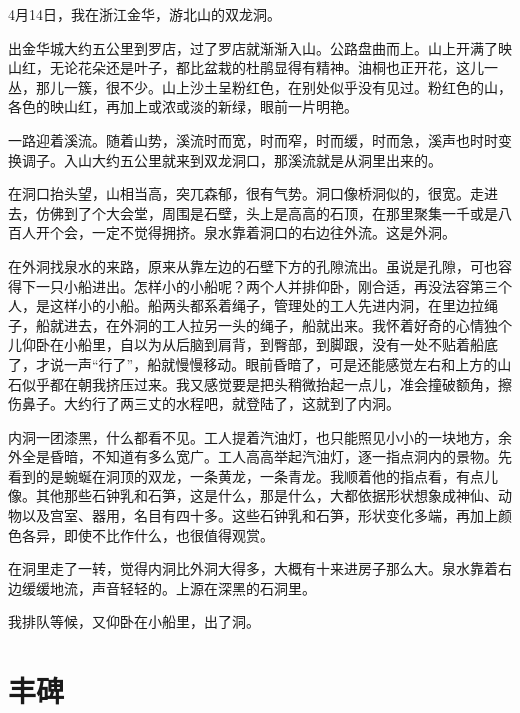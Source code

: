 \documentclass[12pt,UTF-8,openany]{ctexbook}
\begin{document}
\begin{large}
    
    4月14日，我在浙江金华，游北山的双龙洞。
    
    出金华城大约五公里到罗店，过了罗店就渐渐入山。公路盘曲而上。山上开满了映山红，无论花朵还是叶子，都比盆栽的杜鹃显得有精神。油桐也正开花，这儿一丛，那儿一簇，很不少。山上沙土呈粉红色，在别处似乎没有见过。粉红色的山，各色的映山红，再加上或浓或淡的新绿，眼前一片明艳。
    
    一路迎着溪流。随着山势，溪流时而宽，时而窄，时而缓，时而急，溪声也时时变换调子。入山大约五公里就来到双龙洞口，那溪流就是从洞里出来的。
    
    在洞口抬头望，山相当高，突兀森郁，很有气势。洞口像桥洞似的，很宽。走进去，仿佛到了个大会堂，周围是石壁，头上是高高的石顶，在那里聚集一千或是八百人开个会，一定不觉得拥挤。泉水靠着洞口的右边往外流。这是外洞。
    
    在外洞找泉水的来路，原来从靠左边的石壁下方的孔隙流出。虽说是孔隙，可也容得下一只小船进出。怎样小的小船呢？两个人并排仰卧，刚合适，再没法容第三个人，是这样小的小船。船两头都系着绳子，管理处的工人先进内洞，在里边拉绳子，船就进去，在外洞的工人拉另一头的绳子，船就出来。我怀着好奇的心情独个儿仰卧在小船里，自以为从后脑到肩背，到臀部，到脚跟，没有一处不贴着船底了，才说一声“行了”，船就慢慢移动。眼前昏暗了，可是还能感觉左右和上方的山石似乎都在朝我挤压过来。我又感觉要是把头稍微抬起一点儿，准会撞破额角，擦伤鼻子。大约行了两三丈的水程吧，就登陆了，这就到了内洞。
    
    内洞一团漆黑，什么都看不见。工人提着汽油灯，也只能照见小小的一块地方，余外全是昏暗，不知道有多么宽广。工人高高举起汽油灯，逐一指点洞内的景物。先看到的是蜿蜒在洞顶的双龙，一条黄龙，一条青龙。我顺着他的指点看，有点儿像。其他那些石钟乳和石笋，这是什么，那是什么，大都依据形状想象成神仙、动物以及宫室、器用，名目有四十多。这些石钟乳和石笋，形状变化多端，再加上颜色各异，即使不比作什么，也很值得观赏。
    
    在洞里走了一转，觉得内洞比外洞大得多，大概有十来进房子那么大。泉水靠着右边缓缓地流，声音轻轻的。上源在深黑的石洞里。
    
    我排队等候，又仰卧在小船里，出了洞。
    
\end{large}



\chapter{丰碑}
\end{document}

